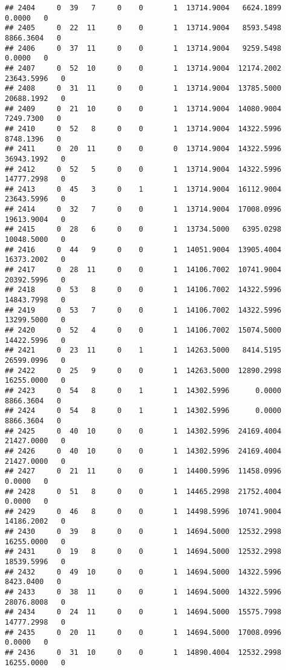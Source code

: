 \documentclass[
]{article}
\begin{document}
\begin{enumerate}
\begin{verbatim}
## 2404     0  39   7     0    0       1  13714.9004   6624.1899      0.0000   0
## 2405     0  22  11     0    0       1  13714.9004   8593.5498   8866.3604   0
## 2406     0  37  11     0    0       1  13714.9004   9259.5498      0.0000   0
## 2407     0  52  10     0    0       1  13714.9004  12174.2002  23643.5996   0
## 2408     0  31  11     0    0       1  13714.9004  13785.5000  20688.1992   0
## 2409     0  21  10     0    0       1  13714.9004  14080.9004   7249.7300   0
## 2410     0  52   8     0    0       1  13714.9004  14322.5996   8748.1396   0
## 2411     0  20  11     0    0       0  13714.9004  14322.5996  36943.1992   0
## 2412     0  52   5     0    0       1  13714.9004  14322.5996  14777.2998   0
## 2413     0  45   3     0    1       1  13714.9004  16112.9004  23643.5996   0
## 2414     0  32   7     0    0       1  13714.9004  17008.0996  19613.9004   0
## 2415     0  28   6     0    0       1  13734.5000   6395.0298  10048.5000   0
## 2416     0  44   9     0    0       1  14051.9004  13905.4004  16373.2002   0
## 2417     0  28  11     0    0       1  14106.7002  10741.9004  20392.5996   0
## 2418     0  53   8     0    0       1  14106.7002  14322.5996  14843.7998   0
## 2419     0  53   7     0    0       1  14106.7002  14322.5996  13299.5000   0
## 2420     0  52   4     0    0       1  14106.7002  15074.5000  14422.5996   0
## 2421     0  23  11     0    1       1  14263.5000   8414.5195  26599.0996   0
## 2422     0  25   9     0    0       1  14263.5000  12890.2998  16255.0000   0
## 2423     0  54   8     0    1       1  14302.5996      0.0000   8866.3604   0
## 2424     0  54   8     0    1       1  14302.5996      0.0000   8866.3604   0
## 2425     0  40  10     0    0       1  14302.5996  24169.4004  21427.0000   0
## 2426     0  40  10     0    0       1  14302.5996  24169.4004  21427.0000   0
## 2427     0  21  11     0    0       1  14400.5996  11458.0996      0.0000   0
## 2428     0  51   8     0    0       1  14465.2998  21752.4004      0.0000   0
## 2429     0  46   8     0    0       1  14498.5996  10741.9004  14186.2002   0
## 2430     0  39   8     0    0       1  14694.5000  12532.2998  16255.0000   0
## 2431     0  19   8     0    0       1  14694.5000  12532.2998  18539.5996   0
## 2432     0  49  10     0    0       1  14694.5000  14322.5996   8423.0400   0
## 2433     0  38  11     0    0       1  14694.5000  14322.5996  28076.8008   0
## 2434     0  24  11     0    0       1  14694.5000  15575.7998  14777.2998   0
## 2435     0  20  11     0    0       1  14694.5000  17008.0996      0.0000   0
## 2436     0  31  10     0    0       1  14890.4004  12532.2998  16255.0000   0

\end{verbatim}
\end{enumerate}
\end{document}
